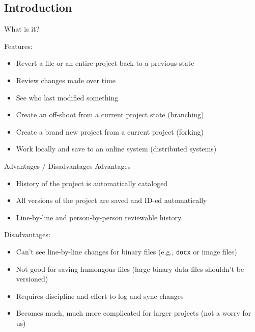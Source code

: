 \documentclass[10pt,t,xcolor=table]{UWMadBeamer}
\newenvironment{Itemize}
    {\begin{itemize}\setlength{\itemsep}{0.50em}\setlength{\leftmargin}{0.0em}\setlength{\labelwidth}{0em}}
    {\end{itemize}}
\begin{document}
    \subsection{Introduction}
    \begin{frame}{What is it?}
        
        Features:
        \begin{Itemize}
            \item{Revert a file or an entire project back to a previous state}
            \item{Review changes made over time}
            \item{See who last modified something}
            \item{Create an off-shoot from a current project state (branching)}
            \item{Create a brand new project from a current project (forking)}
            \item{Work locally and save to an online system (distributed systems)}
        \end{Itemize}
    \end{frame}

    \begin{frame}{Advantages / Disadvantages}
        Advantages
        \begin{Itemize}
            \item{History of the project is automatically cataloged}
            \item{All versions of the project are saved and ID-ed automatically}
            \item{Line-by-line and person-by-person reviewable history.}
        \end{Itemize}
        
        Disadvantages:
        \begin{Itemize}
            \item{Can't see line-by-line changes for binary files (e.g., \texttt{docx} or image files)}
            \item{Not good for saving humongous files (large binary data files shouldn't be versioned)}
            \item{Requires discipline and effort to log and sync changes}
            \item{Becomes much, much more complicated for larger projects (not a worry for us)}
        \end{Itemize}
    \end{frame}
\end{document}

